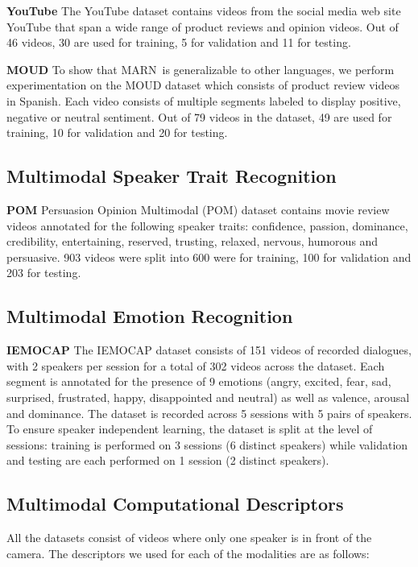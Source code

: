 \documentclass[letterpaper]{article} \usepackage{aaai18}  \usepackage{times}  \usepackage{helvet}  \usepackage{courier}  \usepackage{url}  \usepackage{graphicx}  \usepackage{multirow}
\newcommand{\pipelines}{MARN}
\begin{document}
\textbf{YouTube} The YouTube dataset \cite{morency2011towards} contains videos from the social media web site YouTube that span a wide range of product reviews and opinion videos. Out of 46 videos, 30 are used for training, 5 for validation and 11 for testing.

\textbf{MOUD} To show that \pipelines \ is generalizable to other languages, we perform experimentation on the MOUD dataset \cite{perez-rosas_utterance-level_2013} which consists of product review videos in Spanish. Each video consists of multiple segments labeled to display positive, negative or neutral sentiment. Out of 79 videos in the dataset, 49 are used for training, 10 for validation and 20 for testing.

\subsection{Multimodal Speaker Trait Recognition}
\quad  \textbf{POM} Persuasion Opinion Multimodal (POM) dataset \cite{Park:2014:CAP:2663204.2663260} contains movie review videos annotated for the following speaker traits: confidence, passion, dominance, credibility, entertaining, reserved, trusting, relaxed, nervous, humorous and persuasive. 903 videos were split into 600 were for training, 100 for validation and 203 for testing. 

\subsection{Multimodal Emotion Recognition}
\quad  \textbf{IEMOCAP} The IEMOCAP dataset \cite{Busso2008IEMOCAP:Interactiveemotionaldyadic} consists of 151 videos of recorded dialogues, with 2 speakers per session for a total of 302 videos across the dataset. Each segment is annotated for the presence of 9 emotions (angry, excited, fear, sad, surprised, frustrated, happy, disappointed and neutral) as well as valence, arousal and dominance. The dataset is recorded across 5 sessions with 5 pairs of speakers. To ensure speaker independent learning, the dataset is split at the level of sessions: training is performed on 3 sessions (6 distinct speakers) while validation and testing are each performed on 1 session (2 distinct speakers).

\subsection{Multimodal Computational Descriptors}
All the datasets consist of videos where only one speaker is in front of the camera. The descriptors we used for each of the modalities are as follows: 
\end{document}
